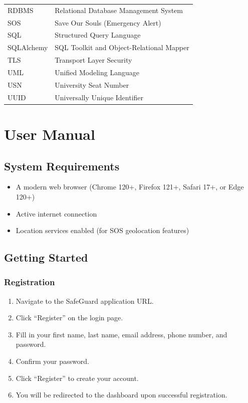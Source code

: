 \begin{table}[H]
\begin{tabularx}{\textwidth}{@{}l X@{}}
    RDBMS & Relational Database Management System \\
    SOS & Save Our Souls (Emergency Alert) \\
    SQL & Structured Query Language \\
    SQLAlchemy & SQL Toolkit and Object-Relational Mapper \\
    TLS & Transport Layer Security \\
    UML & Unified Modeling Language \\
    USN & University Seat Number \\
    UUID & Universally Unique Identifier \\
    \bottomrule
  \end{tabularx}
\end{table}

\chapter{User Manual}

\section{System Requirements}

\begin{itemize}
  \item A modern web browser (Chrome 120+, Firefox 121+, Safari 17+, or Edge 120+)
  \item Active internet connection
  \item Location services enabled (for SOS geolocation features)
\end{itemize}

\section{Getting Started}

\subsection{Registration}
\begin{enumerate}
  \item Navigate to the SafeGuard application URL.
  \item Click ``Register'' on the login page.
  \item Fill in your first name, last name, email address, phone number, and password.
  \item Confirm your password.
  \item Click ``Register'' to create your account.
  \item You will be redirected to the dashboard upon successful registration.
\end{enumerate}

